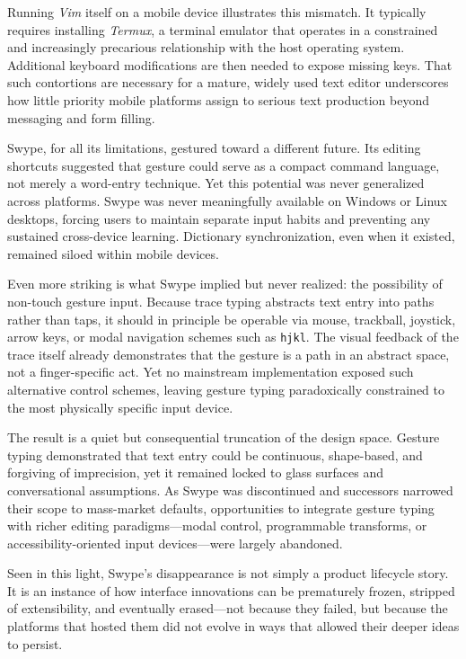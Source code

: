 \documentclass[11pt]{article}
\begin{document}
Running \textit{Vim} itself on a mobile device illustrates this mismatch. It typically requires installing \textit{Termux}, a terminal emulator that operates in a constrained and increasingly precarious relationship with the host operating system. Additional keyboard modifications are then needed to expose missing keys. That such contortions are necessary for a mature, widely used text editor underscores how little priority mobile platforms assign to serious text production beyond messaging and form filling.

Swype, for all its limitations, gestured toward a different future. Its editing shortcuts suggested that gesture could serve as a compact command language, not merely a word-entry technique. Yet this potential was never generalized across platforms. Swype was never meaningfully available on Windows or Linux desktops, forcing users to maintain separate input habits and preventing any sustained cross-device learning. Dictionary synchronization, even when it existed, remained siloed within mobile devices.

Even more striking is what Swype implied but never realized: the possibility of non-touch gesture input. Because trace typing abstracts text entry into paths rather than taps, it should in principle be operable via mouse, trackball, joystick, arrow keys, or modal navigation schemes such as \texttt{hjkl}. The visual feedback of the trace itself already demonstrates that the gesture is a path in an abstract space, not a finger-specific act. Yet no mainstream implementation exposed such alternative control schemes, leaving gesture typing paradoxically constrained to the most physically specific input device.

The result is a quiet but consequential truncation of the design space. Gesture typing demonstrated that text entry could be continuous, shape-based, and forgiving of imprecision, yet it remained locked to glass surfaces and conversational assumptions. As Swype was discontinued and successors narrowed their scope to mass-market defaults, opportunities to integrate gesture typing with richer editing paradigms—modal control, programmable transforms, or accessibility-oriented input devices—were largely abandoned.

Seen in this light, Swype’s disappearance is not simply a product lifecycle story. It is an instance of how interface innovations can be prematurely frozen, stripped of extensibility, and eventually erased—not because they failed, but because the platforms that hosted them did not evolve in ways that allowed their deeper ideas to persist.
\end{document}
